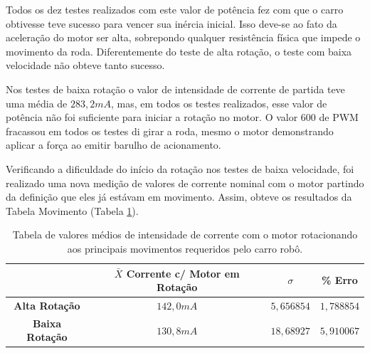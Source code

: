 		Todos os dez testes realizados com este valor de potência fez com que o carro obtivesse teve sucesso para vencer sua inércia inicial. Isso deve-se ao fato da aceleração do motor ser alta, sobrepondo qualquer resistência física que impede o movimento da roda. Diferentemente do teste de alta rotação, o teste com baixa velocidade não obteve tanto sucesso.

		Nos testes de baixa rotação o valor de intensidade de corrente de partida teve uma média de $283,2mA$, mas, em todos os testes realizados, esse valor de potência não foi suficiente para iniciar a rotação no motor. 
		O valor $600$ de PWM fracassou em todos os testes di girar a roda, mesmo o motor demonstrando aplicar a força ao emitir barulho de acionamento. 

		Verificando a dificuldade do início da rotação nos testes de baixa velocidade, foi realizado uma nova medição de valores de corrente nominal com o motor partindo da definição que eles já estávam em movimento. Assim, obteve os resultados da Tabela Movimento (Tabela \ref{tab:corrente_rotacionado}).


	\begin{table}[H]
    	\centering
    	\caption{Tabela de valores médios de intensidade de corrente com o motor rotacionando aos principais movimentos requeridos pelo carro robô.}
	    \begin{tabular}{|c||c|c|c|} \hline
	    ~                      & $\bar{X}$ \textbf{Corrente c/ Motor em Rotação} & $\sigma$   & \textbf{\% Erro} \\ \hline \hline
	    \textbf{Alta  Rotação} & $142,0mA$                                         & $5,656854$ & $1,788854$     \\ \hline
	    \textbf{Baixa Rotação} & $130,8mA$                                         & $18,68927$ & $5,910067$     \\ 
	     \hline
	    \end{tabular}   \label{tab:corrente_rotacionado}
	\end{table}


